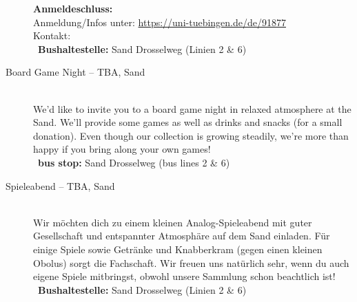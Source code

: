 \begin{description}
	\textbf{Anmeldeschluss:} \matheanmeldung\YEAR\\
	Anmeldung/Infos unter: \url{https://uni-tuebingen.de/de/91877}\\
	Kontakt: \texttt{\mathkontakt}\\
	\ifsommersemester
	~\textbf{Bushaltestelle:} Sand Drosselweg (Linien 2 \& 6) 
	\fi
\fi



\ifml
	\item[Board Game Night -- TBA, Sand]~\\
	We'd like to invite you to a board game night in relaxed atmosphere at the Sand.
    We'll provide some games as well as drinks and snacks (for a small donation).
    Even though our collection is growing steadily, we're more than happy if you bring along your own games!\\
	~\textbf{bus stop:} Sand Drosselweg (bus lines 2 \& 6)
\else
    \item[Spieleabend -- TBA, Sand]~\\
	Wir möchten dich zu einem kleinen Analog-Spieleabend mit guter Gesellschaft und entspannter Atmosphäre auf dem Sand einladen.
    Für einige Spiele sowie Getränke und Knabberkram (gegen einen kleinen Obolus) sorgt die Fachschaft.
    Wir freuen uns natürlich sehr, wenn du auch eigene Spiele mitbringst, obwohl unsere Sammlung schon beachtlich ist!\\
	~\textbf{Bushaltestelle:} Sand Drosselweg (Linien 2 \& 6)
\fi


\end{description}
